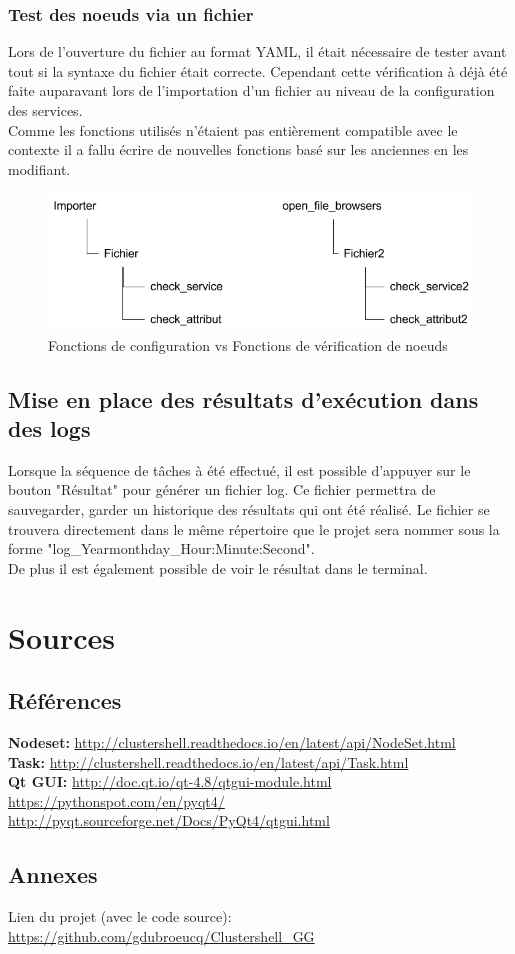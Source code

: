 \documentclass[a4paper,11pt]{article}
\begin{document}
\subsubsection{Test des noeuds via un fichier}
Lors de l'ouverture du fichier au format YAML, il était nécessaire de tester avant tout si la syntaxe du fichier était correcte. Cependant cette vérification à déjà été faite auparavant lors de l'importation d'un fichier au niveau de la configuration des services.\\
Comme les fonctions utilisés n’étaient pas entièrement compatible avec le contexte il a fallu écrire de nouvelles fonctions basé sur les anciennes en les modifiant.\\
\begin{figure}[hbtp]
\centering
\includegraphics[scale=0.5]{difference_importer_openfile.png}
\caption{Fonctions de configuration vs Fonctions de vérification de noeuds}
\end{figure}



\subsection{Mise en place des résultats d'exécution dans des logs}
Lorsque la séquence de tâches à été effectué, il est possible d'appuyer sur le bouton "Résultat" pour générer un fichier log. Ce fichier permettra de sauvegarder, garder un historique des résultats qui ont été réalisé. Le fichier se trouvera directement dans le même répertoire que le projet sera nommer sous la forme "log\_Year\-month\-day\_Hour:Minute:Second".\\
De plus il est également possible de voir le résultat dans le terminal.	

\section{Sources}
\label{sec:section6}
\subsection{Références}
\noindent\textbf{Nodeset:} \url{http://clustershell.readthedocs.io/en/latest/api/NodeSet.html}\\
\textbf{Task:} \url{http://clustershell.readthedocs.io/en/latest/api/Task.html}\\
\textbf{Qt GUI:} \url {http://doc.qt.io/qt-4.8/qtgui-module.html}\\
\url {https://pythonspot.com/en/pyqt4/}\\
\url {http://pyqt.sourceforge.net/Docs/PyQt4/qtgui.html} 

\pagebreak
\subsection{Annexes}
\noindent
Lien du projet (avec le code source):
\smallbreak
\url{https://github.com/gdubroeucq/Clustershell_GG}
\end{document}
